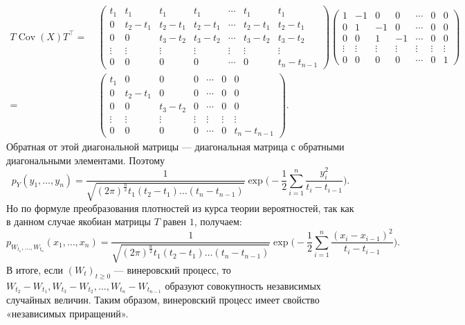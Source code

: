 \documentclass[10pt]{article}
\theoremstyle{boldnormal}
\theoremstyle{boldremark}
\begin{document}
{\footnotesize 
\begin{align*}
T\operatorname{Cov}(X)T^{\intercal}
= & \ 
\begin{pmatrix}
t_1 & t_1 & t_1 & t_1 & \cdots & t_1 & t_1  
\\
0 & t_2 - t_1 & t_2 - t_1 & t_2 - t_1  & \cdots & t_2 - t_1 & t_2 - t_1
\\
0 & 0  & t_3 - t_2 & t_3 - t_2 & \cdots & t_3 - t_2 & t_3 - t_2
\\
\vdots & \vdots & \vdots & \vdots & \vdots & \vdots & \vdots 
\\
0 & 0 & 0 & 0 & \cdots & 0 & t_n - t_{n-1}
\end{pmatrix}
\begin{pmatrix}
1 & -1 & 0 & 0 & \cdots & 0 & 0 
\\
0 & 1 & -1 & 0 & \cdots & 0 & 0
\\
0 & 0 & 1 & -1 & \cdots & 0 & 0
\\
\vdots & \vdots & \vdots & \vdots & \vdots & \vdots & \vdots 
\\
0 & 0 & 0 & 0 & \cdots & 0 & 1
\end{pmatrix} 
\\
= & \ 
\begin{pmatrix}
t_1 & 0 & 0 & 0 & \cdots & 0 & 0 
\\
0 & t_2 - t_1 & 0 & 0 & \cdots & 0 & 0
\\
0 & 0 & t_3 - t_2 & 0 & \cdots & 0 & 0
\\
\vdots & \vdots & \vdots & \vdots & \vdots & \vdots & \vdots 
\\
0 & 0 & 0 & 0 & \cdots & 0 & t_n - t_{n-1}
\end{pmatrix}.
\end{align*}
}
Обратная от этой диагональной матрицы --- диагональная матрица 
с обратными диагональными элементами. Поэтому
$$
p_{Y}(y_1, \dots, y_n) 
= \frac{1}{\sqrt{(2\pi)^{\frac{n}{2}} t_1 (t_2-t_1) \dots (t_n-t_{n-1})}}
\exp \big( -\frac{1}{2} \sum_{i=1}^n 
\frac{y_i^2}{t_i - t_{i-1}} \big).
$$
Но по формуле преобразования плотностей из курса 
теории вероятностей, так как в данном случае
якобиан матрицы \(T\) равен \(1\), получаем:
$$
p_{W_{t_1}, \dots, W_{t_n}}(x_1, \dots, x_n)
= \frac{1}{\sqrt{(2\pi)^{\frac{n}{2}}
t_1 (t_2-t_1) \dots (t_n-t_{n-1})}} 
\exp \bigg( -\frac{1}{2} \sum_{i=1}^n 
\frac{(x_i - x_{i-1})^2}{t_i - t_{i-1}} \bigg).
$$
В итоге, если
$(W_t)_{t \geq 0}$ --- винеровский процесс, то
$W_{t_2}-W_{t_1}, W_{t_3}-W_{t_2}, \dots, W_{t_n}-W_{t_{n-1}}$
образуют совокупность независимых случайных величин.
Таким образом, винеровский процесс имеет свойство «независимых приращений».
\end{document}
